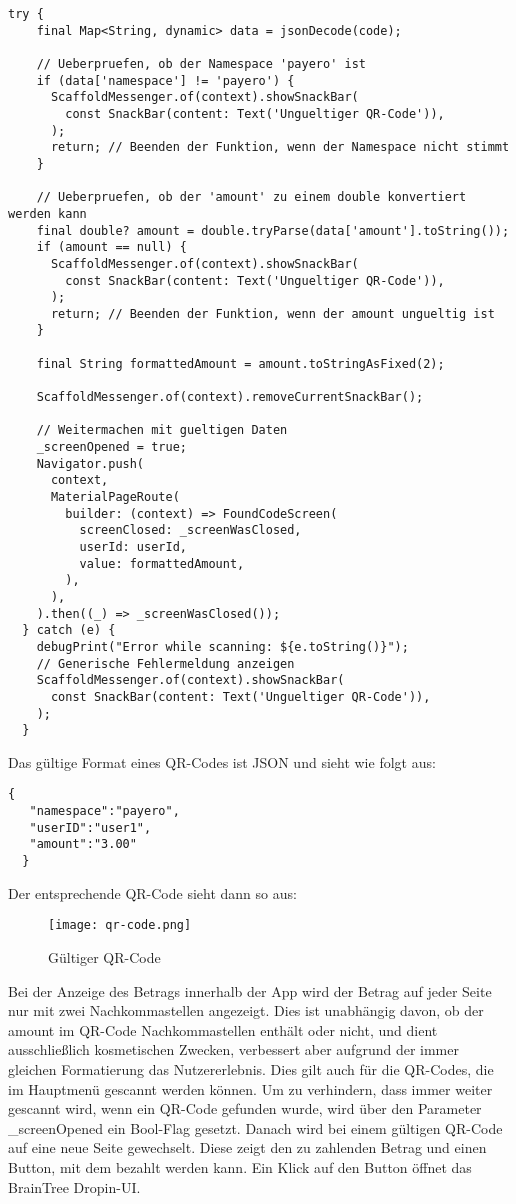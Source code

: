 \begin{lstlisting}[caption={QR-Code Check}]
  try {
    final Map<String, dynamic> data = jsonDecode(code);

    // Ueberpruefen, ob der Namespace 'payero' ist
    if (data['namespace'] != 'payero') {
      ScaffoldMessenger.of(context).showSnackBar(
        const SnackBar(content: Text('Ungueltiger QR-Code')),
      );
      return; // Beenden der Funktion, wenn der Namespace nicht stimmt
    }

    // Ueberpruefen, ob der 'amount' zu einem double konvertiert werden kann
    final double? amount = double.tryParse(data['amount'].toString());
    if (amount == null) {
      ScaffoldMessenger.of(context).showSnackBar(
        const SnackBar(content: Text('Ungueltiger QR-Code')),
      );
      return; // Beenden der Funktion, wenn der amount ungueltig ist
    }

    final String formattedAmount = amount.toStringAsFixed(2);

    ScaffoldMessenger.of(context).removeCurrentSnackBar();

    // Weitermachen mit gueltigen Daten
    _screenOpened = true;
    Navigator.push(
      context,
      MaterialPageRoute(
        builder: (context) => FoundCodeScreen(
          screenClosed: _screenWasClosed,
          userId: userId,
          value: formattedAmount,
        ),
      ),
    ).then((_) => _screenWasClosed());
  } catch (e) {
    debugPrint("Error while scanning: ${e.toString()}");
    // Generische Fehlermeldung anzeigen
    ScaffoldMessenger.of(context).showSnackBar(
      const SnackBar(content: Text('Ungueltiger QR-Code')),
    );
  }
\end{lstlisting}

Das gültige Format eines QR-Codes ist JSON und sieht wie folgt aus:

\begin{lstlisting}[caption={Gültiger QR-Code}]
  {
   "namespace":"payero",
   "userID":"user1",
   "amount":"3.00"
  }
\end{lstlisting}

Der entsprechende QR-Code sieht dann so aus:

\begin{figure}[H]
  \centering
  \texttt{[image: qr-code.png]}
  \caption{Gültiger QR-Code}
\end{figure}

Bei der Anzeige des Betrags innerhalb der App wird der Betrag auf jeder Seite nur mit zwei Nachkommastellen angezeigt.
Dies ist unabhängig davon, ob der \glqq amount\grqq{} im QR-Code Nachkommastellen enthält oder nicht, und dient ausschließlich kosmetischen Zwecken, verbessert aber aufgrund der immer gleichen Formatierung das Nutzererlebnis.
Dies gilt auch für die QR-Codes, die im Hauptmenü gescannt werden können.
Um zu verhindern, dass immer weiter gescannt wird, wenn ein QR-Code gefunden wurde, wird über den Parameter \glqq \_screenOpened\grqq{} ein Bool-Flag gesetzt.
Danach wird bei einem gültigen QR-Code auf eine neue Seite gewechselt.
Diese zeigt den zu zahlenden Betrag und einen Button, mit dem bezahlt werden kann.
Ein Klick auf den Button öffnet das BrainTree Dropin-UI.

